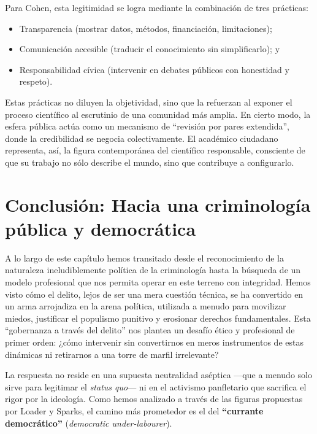 \documentclass[
  spanish,
  letterpaper,
  DIV=11,
  numbers=noendperiod]{scrreprt}
\begin{document}
\begin{tcolorbox}
Para Cohen, esta legitimidad se logra mediante la combinación de tres
prácticas:

\begin{itemize}
\item
  Transparencia (mostrar datos, métodos, financiación, limitaciones);
\item
  Comunicación accesible (traducir el conocimiento sin simplificarlo); y
\item
  Responsabilidad cívica (intervenir en debates públicos con honestidad
  y respeto).
\end{itemize}

Estas prácticas no diluyen la objetividad, sino que la refuerzan al
exponer el proceso científico al escrutinio de una comunidad más amplia.
En cierto modo, la esfera pública actúa como un mecanismo de ``revisión
por pares extendida'', donde la credibilidad se negocia colectivamente.
El académico ciudadano representa, así, la figura contemporánea del
científico responsable, consciente de que su trabajo no sólo describe el
mundo, sino que contribuye a configurarlo.

\end{tcolorbox}

\section{Conclusión: Hacia una criminología pública y
democrática}\label{conclusiuxf3n-hacia-una-criminologuxeda-puxfablica-y-democruxe1tica}

A lo largo de este capítulo hemos transitado desde el reconocimiento de
la naturaleza ineludiblemente política de la criminología hasta la
búsqueda de un modelo profesional que nos permita operar en este terreno
con integridad. Hemos visto cómo el delito, lejos de ser una mera
cuestión técnica, se ha convertido en un arma arrojadiza en la arena
política, utilizada a menudo para movilizar miedos, justificar el
populismo punitivo y erosionar derechos fundamentales. Esta ``gobernanza
a través del delito'' nos plantea un desafío ético y profesional de
primer orden: ¿cómo intervenir sin convertirnos en meros instrumentos de
estas dinámicas ni retirarnos a una torre de marfil irrelevante?

La respuesta no reside en una supuesta neutralidad aséptica ---que a
menudo solo sirve para legitimar el \emph{status quo}--- ni en el
activismo panfletario que sacrifica el rigor por la ideología. Como
hemos analizado a través de las figuras propuestas por Loader y Sparks,
el camino más prometedor es el del \textbf{``currante democrático''}
(\emph{democratic under-labourer}).
\end{document}
